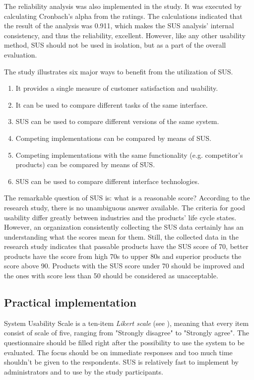 \documentclass[12pt,a4paper,oneside,pdftex]{report}
\begin{document}
The reliability analysis was also implemented in the study. It was executed by calculating Cronbach's alpha from the ratings. The calculations indicated that the result of the analysis was 0.911, which makes the SUS analysis' internal consistency, and thus the reliability, excellent. However, like any other usability method, SUS should not be used in isolation, but as a part of the overall evaluation. \citep{RefWorks:12}

The study illustrates six major ways to benefit from the utilization of SUS. \citep{RefWorks:12}
\begin{enumerate}
\item It provides a single measure of customer satisfaction and usability.
\item It can be used to compare different tasks of the same interface. 
\item SUS can be used to compare different versions of the same system.
\item Competing implementations can be compared by means of SUS.
\item Competing implementations with the same functionality (e.g. competitor's products) can be compared by means of SUS.
\item SUS can be used to compare different interface technologies.
\end{enumerate}

The remarkable question of SUS is: what is a reasonable score? According to the research study, there is no unambiguous answer available. The criteria for good usability differ greatly between industries and the products' life cycle states. However, an organization consistently collecting the SUS data certainly has an understanding what the scores mean for them. Still, the collected data in the research study indicates that passable products have the SUS score of 70, better products have the score from high 70s to upper 80s and superior products the score above 90. Products with the SUS score under 70 should be improved and the ones with score less than 50 should be considered as unacceptable. \citep{RefWorks:12}

\subsection{Practical implementation}
System Usability Scale is a ten-item \emph{Likert scale} (see ), meaning that every item consist of scale of five, ranging from "Strongly disagree" to "Strongly agree". The questionnaire should be filled right after the possibility to use the system to be evaluated. The focus should be on immediate responses and too much time shouldn't be given to the respondents. SUS is relatively fast to implement by administrators and to use by the study participants. \citep{RefWorks:10} 
\end{document}
